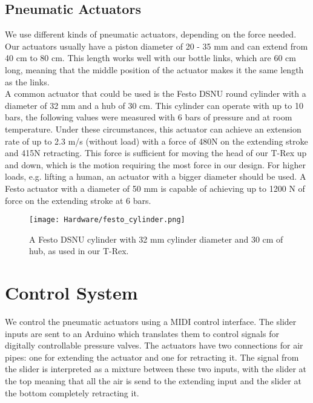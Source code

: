 \subsection{Pneumatic Actuators}
We use different kinds of pneumatic actuators, depending on the force needed. Our actuators usually have a piston diameter of 20 - 35 mm and can extend from 40 cm to 80 cm. This length works well with our bottle links, which are 60 cm long, meaning that the middle position of the actuator makes it the same length as the links.\\
A common actuator that could be used is the Festo DSNU round cylinder with a diameter of 32 mm and a hub of 30 cm. This cylinder can operate with up to 10 bars, the following values were measured with 6 bars of pressure and at room temperature. Under these circumstances, this actuator can achieve an extension rate of up to 2.3 m/s (without load) with a force of 480N on the extending stroke and 415N retracting. This force is sufficient for moving the head of our T-Rex up and down, which is the motion requiring the most force in our design. For higher loads, e.g. lifting a human, an actuator with a bigger diameter should be used. A Festo actuator with a diameter of 50 mm is capable of achieving up to 1200 N of force on the extending stroke at 6 bars.
\begin{figure}[h!]
    \texttt{[image: Hardware/festo\_cylinder.png]}
    \centering
    \caption{A Festo DSNU cylinder with 32 mm cylinder diameter and 30 cm of hub, as used in our T-Rex.}
    \label{fig:festo_cylinder}
\end{figure}

\section{Control System}
We control the pneumatic actuators using a MIDI control interface. The slider inputs are sent to an Arduino which translates them to control signals for digitally controllable pressure valves. The actuators have two connections for air pipes: one for extending the actuator and one for retracting it. The signal from the slider is interpreted as a mixture between these two inputs, with the slider at the top meaning that all the air is send to the extending input and the slider at the bottom completely retracting it.

